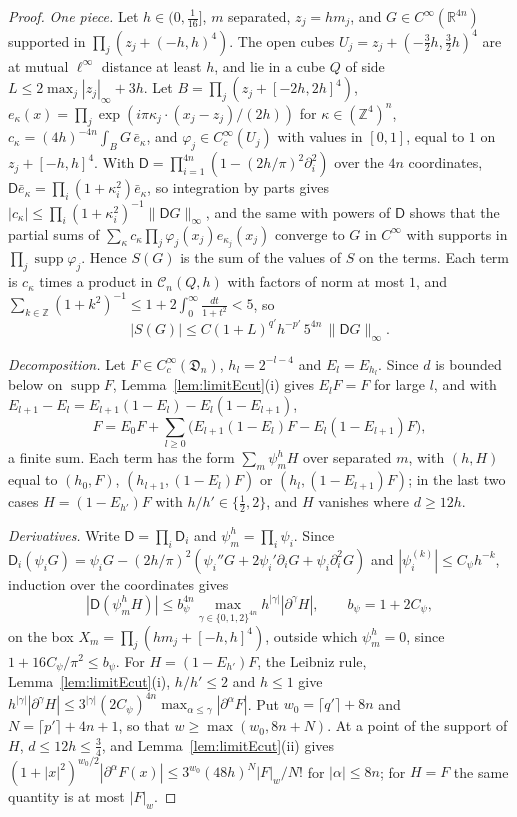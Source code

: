 \documentclass[aps,prd,twocolumn,superscriptaddress,nofootinbib,longbibliography,floatfix,amsmath,amssymb,10pt]{revtex4-2}
\theoremstyle{definition}
\theoremstyle{remark}
\newcommand{\R}{\mathbb{R}}
\newcommand{\Z}{\mathbb{Z}}
\begin{document}
\begin{proof}
\emph{One piece.} Let $h\in(0,\frac1{16}]$, $m$ separated, $z_j=hm_j$, and
$G\in C^\infty(\R^{4n})$ supported in $\prod_j(z_j+(-h,h)^4)$. The open cubes
$U_j=z_j+(-\frac32h,\frac32h)^4$ are at mutual $\ell^\infty$ distance at least
$h$, and lie in a cube $Q$ of side $L\le2\max_j|z_j|_\infty+3h$. Let
$B=\prod_j(z_j+[-2h,2h]^4)$, $e_\kappa(x)=\prod_j\exp(i\pi\kappa_j\cdot(x_j-
z_j)/(2h))$ for $\kappa\in(\Z^4)^n$, $c_\kappa=(4h)^{-4n}\int_BG\,\bar e_\kappa$,
and $\varphi_j\in C^\infty_c(U_j)$ with values in $[0,1]$, equal to $1$ on
$z_j+[-h,h]^4$. With $\mathsf D=\prod_{i=1}^{4n}(1-(2h/\pi)^2\partial_i^2)$
over the $4n$ coordinates, $\mathsf D\bar e_\kappa=\prod_i(1+\kappa_i^2)\bar
e_\kappa$, so integration by parts gives $|c_\kappa|\le\prod_i(1+\kappa_i^2)^{-1}
\|\mathsf DG\|_\infty$, and the same with powers of $\mathsf D$ shows that the
partial sums of $\sum_\kappa c_\kappa\prod_j\varphi_j(x_j)e_{\kappa_j}(x_j)$
converge to $G$ in $C^\infty$ with supports in $\prod_j\operatorname{supp}
\varphi_j$. Hence $S(G)$ is the sum of the values of $S$ on the terms. Each
term is $c_\kappa$ times a product in $\mathcal C_n(Q,h)$ with factors of norm
at most $1$, and $\sum_{k\in\Z}(1+k^2)^{-1}\le1+2\int_0^\infty\frac{dt}{1+t^2}
<5$, so
\[
|S(G)|\le C(1+L)^{q'}h^{-p'}\,5^{4n}\,\|\mathsf DG\|_\infty .
\]

\emph{Decomposition.} Let $F\in C^\infty_c(\mathfrak D_n)$, $h_l=2^{-l-4}$
and $E_l=E_{h_l}$. Since $d$ is bounded below on $\operatorname{supp}F$,
Lemma~\ref{lem:limitEcut}(i) gives $E_lF=F$ for large $l$, and with
$E_{l+1}-E_l=E_{l+1}(1-E_l)-E_l(1-E_{l+1})$,
\[
F=E_0F+\sum_{l\ge0}\bigl(E_{l+1}(1-E_l)F-E_l(1-E_{l+1})F\bigr),
\]
a finite sum. Each term has the form $\sum_m\psi^h_mH$ over separated $m$,
with $(h,H)$ equal to $(h_0,F)$, $(h_{l+1},(1-E_l)F)$ or $(h_l,(1-E_{l+1})F)$;
in the last two cases $H=(1-E_{h'})F$ with $h/h'\in\{\frac12,2\}$, and $H$
vanishes where $d\ge12h$.

\emph{Derivatives.} Write $\mathsf D=\prod_i\mathsf D_i$ and $\psi^h_m=\prod_i
\psi_i$. Since $\mathsf D_i(\psi_iG)=\psi_iG-(2h/\pi)^2(\psi_i''G+2\psi_i'
\partial_iG+\psi_i\partial_i^2G)$ and $|\psi_i^{(k)}|\le C_\psi h^{-k}$,
induction over the coordinates gives
\[
|\mathsf D(\psi^h_mH)|\le b_\psi^{4n}\max_{\gamma\in\{0,1,2\}^{4n}}h^{|\gamma|}
|\partial^\gamma H|,\qquad b_\psi=1+2C_\psi,
\]
on the box $X_m=\prod_j(hm_j+[-h,h]^4)$, outside which $\psi^h_m=0$, since
$1+16C_\psi/\pi^2\le b_\psi$. For $H=(1-E_{h'})F$, the Leibniz rule,
Lemma~\ref{lem:limitEcut}(i), $h/h'\le2$ and $h\le1$ give $h^{|\gamma|}
|\partial^\gamma H|\le3^{|\gamma|}(2C_\psi)^{4n}\max_{\alpha\le\gamma}
|\partial^\alpha F|$. Put $w_0=\lceil q'\rceil+8n$ and $N=\lceil p'\rceil+4n+1$,
so that $w\ge\max(w_0,8n+N)$. At a point of the support of $H$, $d\le12h\le
\frac34$, and Lemma~\ref{lem:limitEcut}(ii) gives $(1+|x|^2)^{w_0/2}
|\partial^\alpha F(x)|\le3^{w_0}(48h)^N|F|_w/N!$ for $|\alpha|\le8n$; for $H=F$
the same quantity is at most $|F|_w$.


\end{proof}
\end{document}

